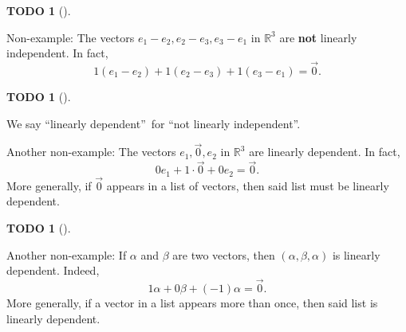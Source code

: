 \documentclass[numbers=enddot,12pt,final,onecolumn,notitlepage]{scrartcl}%
\theoremstyle{definition}
\newtheorem{quest}[theo]{TODO}
\newenvironment{todo}[1][]
{\begin{quest}[#1]\begin{leftbar}}
{\end{leftbar}\end{quest}}
\begin{document}
\begin{todo}
Non-example: The vectors $e_{1}-e_{2},e_{2}-e_{3},e_{3}-e_{1}$ in
$\mathbb{R}^{3}$ are \textbf{not} linearly independent. In fact,%
\[
1\left(  e_{1}-e_{2}\right)  +1\left(  e_{2}-e_{3}\right)  +1\left(
e_{3}-e_{1}\right)  =\overrightarrow{0}.
\]

\end{todo}

\begin{todo}
We say \textquotedblleft linearly dependent\textquotedblright\ for
\textquotedblleft not linearly independent\textquotedblright.

Another non-example: The vectors $e_{1},\overrightarrow{0},e_{2}$ in
$\mathbb{R}^{3}$ are linearly dependent. In fact,%
\[
0e_{1}+1\cdot\overrightarrow{0}+0e_{2}=\overrightarrow{0}.
\]
More generally, if $\overrightarrow{0}$ appears in a list of vectors, then
said list must be linearly dependent.
\end{todo}

\begin{todo}
Another non-example: If $\alpha$ and $\beta$ are two vectors, then $\left(
\alpha,\beta,\alpha\right)  $ is linearly dependent. Indeed,%
\[
1\alpha+0\beta+\left(  -1\right)  \alpha=\overrightarrow{0}.
\]
More generally, if a vector in a list appears more than once, then said list
is linearly dependent.
\end{todo}
\end{document}
